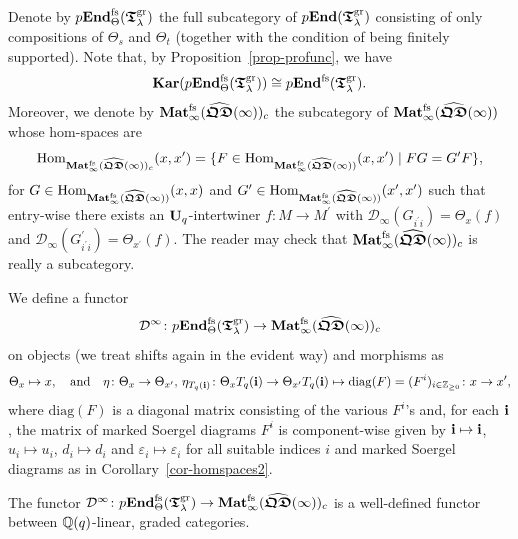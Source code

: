 Denote by $\Endo_{\Theta}^{\mathrm{fs}}(\Tgrl)$ the full 
subcategory of $\Endo(\Tgrl)$ consisting of 
only compositions of $\Theta_s$ and $\Theta_t$ (together with the 
condition of being finitely supported). 
Note that, by Proposition~\ref{prop-profunc}, 
we have
\[
\Kar(\Endo_{\Theta}^{\mathrm{fs}}(\Tgrl))\cong\Endo^{\mathrm{fs}}(\Tgrl).
\] 
Moreover, we denote by $\Mati(\QDk)_c$ the 
subcategory of $\Mati(\QDk)$ whose hom-spaces are
\begin{equation}\label{eq-homfunctors}
\Hom_{\Mati(\QDk)_c}(x,x^{\prime})=\{F\in\Hom_{\Mati(\QDk)}(x,x^{\prime})\mid FG=G^{\prime}F\},
\end{equation}
for $G\in\Hom_{\Mati(\QDk)}(x,x)$ and 
$G^{\prime}\in\Hom_{\Mati(\QDk)}(x^{\prime},x^{\prime})$ 
such that entry-wise there exists an $\Uq$-intertwiner 
$f\colon M\to M^{\prime}$ with 
$\mathcal{D}_{\infty}(G_{i^{\prime}i})=\Theta_x(f)$ and $\mathcal{D}_{\infty}(G^{\prime}_{i^{\prime}i})=\Theta_{x^{\prime}}(f)$. 
The reader may check that $\Mati(\QDk)_c$ is really a subcategory.




\begin{defn}\label{defn-diaforend2}
We define a functor
\[
\mathcal{D}^{\infty}\colon\Endo_{\Theta}^{\mathrm{fs}}(\Tgrl)\to\Mati(\QDk)_c
\]
on objects (we treat shifts again in the evident way) and morphisms as
\[
\Theta_x\mapsto x,\quad\text{and}\quad\eta\colon\Theta_x\to\Theta_{x^{\prime}},\,\eta_{\Tn{\bbi}}\colon\Theta_x\Tn{\bbi}\to\Theta_{x^{\prime}}\Tn{\bbi} \mapsto \mathrm{diag}(F)=(F^i)_{i\in\bN}\colon x\to x^{\prime},
\]
where $\mathrm{diag}(F)$ is a diagonal matrix 
consisting of the various $F^i$'s and, for 
each $\bbi$, the matrix of marked Soergel 
diagrams $F^i$ is component-wise given by 
$\bbi\mapsto\bbi$, $u_i\mapsto u_i$, 
$d_i\mapsto d_i$ and $\varepsilon_i\mapsto\varepsilon_i$ 
for all suitable indices $i$ and marked Soergel diagrams as in Corollary~\ref{cor-homspaces2}.
\end{defn}




\begin{lem}\label{lem-welldefagain}
The functor $\mathcal{D}^{\infty}\colon\Endo_{\Theta}^{\mathrm{fs}}(\Tgrl)\to\Mati(\QDk)_c$ 
is a well-defined functor between $\bC$-linear, graded categories.\makeqed
\end{lem}



